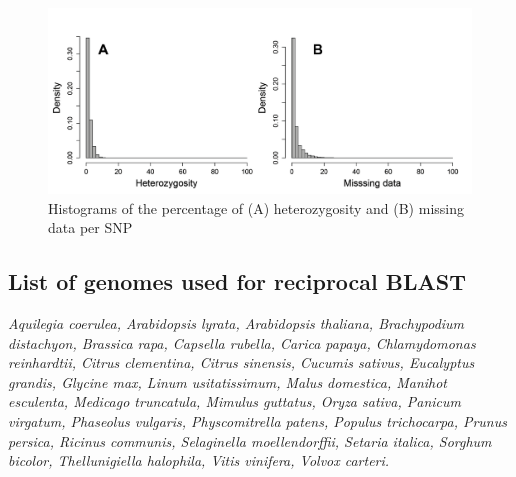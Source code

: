 \documentclass[12pt]{article}
\begin{document}
\begin{figure}[h]
  \begin{center}
   \includegraphics[width=150mm]{FigureS1.png}
    \caption{Histograms of the percentage of (A) heterozygosity and (B) missing data per SNP}
   \label{figureS1}
  \end{center}
\end{figure}

\subsection*{List of genomes used for reciprocal BLAST}
\it{Aquilegia coerulea}, 
\it{Arabidopsis lyrata}, 
\it{Arabidopsis thaliana}, 
\it{Brachypodium distachyon}, 
\it{Brassica rapa}, 
\it{Capsella rubella}, 
\it{Carica papaya}, 
\it{Chlamydomonas reinhardtii}, 
\it{Citrus clementina}, 
\it{Citrus sinensis}, 
\it{Cucumis sativus}, 
\it{Eucalyptus grandis}, 
\it{Glycine max}, 
\it{Linum usitatissimum}, 
\it{Malus domestica}, 
\it{Manihot esculenta}, 
\it{Medicago truncatula}, 
\it{Mimulus guttatus}, 
\it{Oryza sativa}, 
\it{Panicum virgatum}, 
\it{Phaseolus vulgaris}, 
\it{Physcomitrella patens}, 
\it{Populus trichocarpa}, 
\it{Prunus persica}, 
\it{Ricinus communis}, 
\it{Selaginella moellendorffii}, 
\it{Setaria italica}, 
\it{Sorghum bicolor}, 
\it{Thellunigiella halophila}, 
\it{Vitis vinifera}, 
\it{Volvox carteri}.
\end{document}
